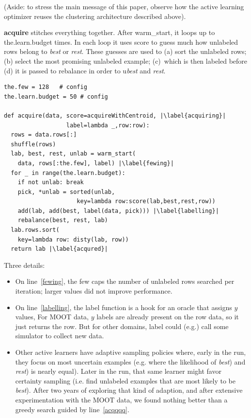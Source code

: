 \documentclass[AMA,STIX2COL]{WileyNJDv5}
\begin{document}
(Aside: to stress the main 
message of this paper, observe how the active learning optimizer reuses the 
clustering architecture described above).


\textbf{acquire} stitches everything together. After \textsf{warm\_start}, 
it loops up to \textsf{the.learn.budget} times.
In each loop it uses \textsf{score} to guess  much how unlabeled rows
belong to {\em best} or {\em rest}. These guesses
are used to (a) sort the   unlabeled rows; (b) select the most promising
unlabeled example; (c)~which is then labeled
before (d) it is passed to   \textsf{rebalance}  in order to
u\textit{best} and 
\textit{rest}.
\begin{lstlisting}
the.few = 128   # config
the.learn.budget = 50 # config

def acquire(data, score=acquireWithCentroid, |\label{acquiring}|
                  label=lambda _,row:row): 
  rows = data.rows[:]
  shuffle(rows)
  lab, best, rest, unlab = warm_start(
    data, rows[:the.few], label) |\label{fewing}|
  for _ in range(the.learn.budget):
    if not unlab: break
    pick, *unlab = sorted(unlab,
                     key=lambda row:score(lab,best,rest,row))
    add(lab, add(best, label(data, pick))) |\label{labelling}|
    rebalance(best, rest, lab)
  lab.rows.sort(
    key=lambda row: disty(lab, row))
  return lab |\label{acqured}|
\end{lstlisting}
Three details:
\begin{itemize}
\item
On  line~\ref{fewing}, 
the \textsf{few} caps the number of unlabeled rows searched
 per iteration; larger values did not improve performance.
\item
On line~\ref{labelling},
the 
\textsf{label} function is 
a hook for an oracle  that assigns $y$ values,
For MOOT data, $y$ labels are already present on the row data, so it just returns
the   row. But for other domains, \textsf{label} could (e.g.) call some
simulator to collect new data.
\item
Other active learners have adaptive sampling policies where, early in the run,
they focus on   most uncertain
examples (e.g. where the likelihood of {\em best}) and {\em rest}) is nearly equal). Later in the run, that same learner  might favor  certainty sampling (i.e. find unlabeled examples that are most
likely to be {\em best}). After two years of exploring that kind of adaption, and after extensive
experimentation with the MOOT data, we found   nothing   better than
a
greedy search guided by line~\ref{acqqqq}.
\end{itemize}
\end{document}
